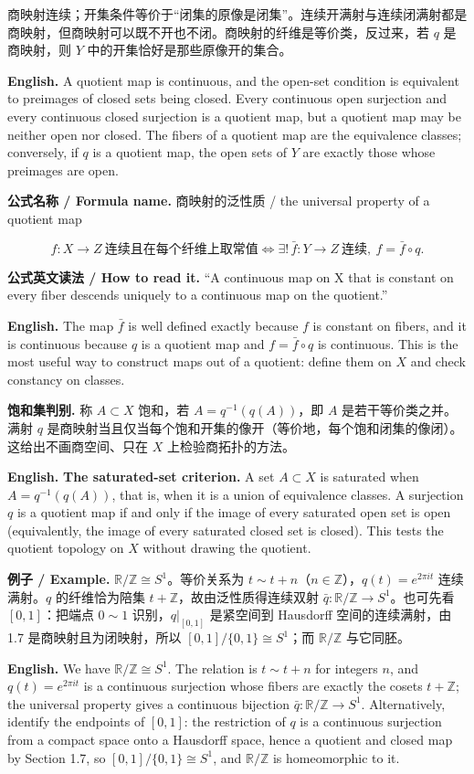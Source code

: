 \documentclass[UTF8,11pt,a4paper]{ctexart}
\newcommand{\EN}[1]{\par\noindent\textbf{English.} #1\par}
\newcommand{\READ}[1]{\par\noindent\textbf{公式英文读法 / How to read it.} #1\par}
\newcommand{\FORMULA}[2]{\par\noindent\textbf{公式名称 / Formula name.} #1 / #2\par}
\newcommand{\EX}[2]{\par\noindent\textbf{例子 / Example.} #1\par\EN{#2}}
\begin{document}
\noindent 商映射连续；开集条件等价于“闭集的原像是闭集”。连续开满射与连续闭满射都是商映射，但商映射可以既不开也不闭。商映射的纤维是等价类，反过来，若 $q$ 是商映射，则 $Y$ 中的开集恰好是那些原像开的集合。
\EN{A quotient map is continuous, and the open-set condition is equivalent to preimages of closed sets being closed. Every continuous open surjection and every continuous closed surjection is a quotient map, but a quotient map may be neither open nor closed. The fibers of a quotient map are the equivalence classes; conversely, if $q$ is a quotient map, the open sets of $Y$ are exactly those whose preimages are open.}

\FORMULA{商映射的泛性质}{the universal property of a quotient map}
\[
f:X\to Z\ \text{连续且在每个纤维上取常值}
\iff
\exists!\,\bar f:Y\to Z\ \text{连续},\ f=\bar f\circ q .
\]
\READ{``A continuous map on X that is constant on every fiber descends uniquely to a continuous map on the quotient.''}
\EN{The map $\bar f$ is well defined exactly because $f$ is constant on fibers, and it is continuous because $q$ is a quotient map and $f=\bar f\circ q$ is continuous. This is the most useful way to construct maps out of a quotient: define them on $X$ and check constancy on classes.}

\noindent\textbf{饱和集判别.} 称 $A\subset X$ 饱和，若 $A=q^{-1}(q(A))$，即 $A$ 是若干等价类之并。满射 $q$ 是商映射当且仅当每个饱和开集的像开（等价地，每个饱和闭集的像闭）。这给出不画商空间、只在 $X$ 上检验商拓扑的方法。
\EN{\textbf{The saturated-set criterion.} A set $A\subset X$ is saturated when $A=q^{-1}(q(A))$, that is, when it is a union of equivalence classes. A surjection $q$ is a quotient map if and only if the image of every saturated open set is open (equivalently, the image of every saturated closed set is closed). This tests the quotient topology on $X$ without drawing the quotient.}

\EX{$\mathbb R/\mathbb Z\cong S^1$。等价关系为 $t\sim t+n$（$n\in\mathbb Z$），$q(t)=e^{2\pi it}$ 连续满射。$q$ 的纤维恰为陪集 $t+\mathbb Z$，故由泛性质得连续双射 $\bar q:\mathbb R/\mathbb Z\to S^1$。也可先看 $[0,1]$：把端点 $0\sim1$ 识别，$q|_{[0,1]}$ 是紧空间到 Hausdorff 空间的连续满射，由 1.7 是商映射且为闭映射，所以 $[0,1]/\{0,1\}\cong S^1$；而 $\mathbb R/\mathbb Z$ 与它同胚。}{We have $\mathbb R/\mathbb Z\cong S^1$. The relation is $t\sim t+n$ for integers $n$, and $q(t)=e^{2\pi it}$ is a continuous surjection whose fibers are exactly the cosets $t+\mathbb Z$; the universal property gives a continuous bijection $\bar q:\mathbb R/\mathbb Z\to S^1$. Alternatively, identify the endpoints of $[0,1]$: the restriction of $q$ is a continuous surjection from a compact space onto a Hausdorff space, hence a quotient and closed map by Section 1.7, so $[0,1]/\{0,1\}\cong S^1$, and $\mathbb R/\mathbb Z$ is homeomorphic to it.}
\end{document}
